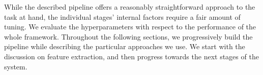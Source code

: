 While the described pipeline offers a reasonably straightforward approach to the task at hand, the individual stages' internal factors require a fair amount of tuning. We evaluate the hyperparameters with respect to the performance of the whole framework. Throughout the following sections, we progressively build the pipeline while describing the particular approaches we use. We start with the discussion on feature extraction, and then progress towards the next stages of the system.  








